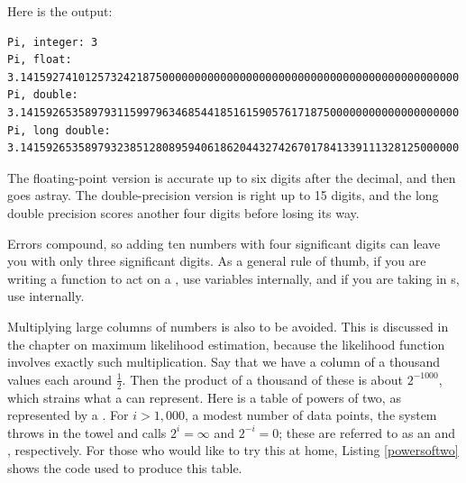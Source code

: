 Here is the output:
\begin{lstlisting}[language={}]
Pi, integer: 3
Pi, float:  3.14159274101257324218750000000000000000000000000000000000000000000000
Pi, double:      3.14159265358979311599796346854418516159057617187500000000000000000000
Pi, long double: 3.14159265358979323851280895940618620443274267017841339111328125000000
\end{lstlisting}
The floating-point version is accurate up to six digits after the
decimal, and then goes astray. The double-precision version is right up to 15
digits, and the long double precision scores another four digits before
losing its way.

Errors compound, so adding ten numbers
with four significant digits can leave you with only three significant
digits. As a general rule of thumb, if you are writing a
function to act on a , use  variables internally,
and if you are taking in s, use  internally.

\label{precisionproblem}
Multiplying large columns of numbers is also to be avoided. This is
discussed in the chapter on maximum likelihood estimation, because the
likelihood function involves exactly such multiplication. Say that we
have a column of a thousand values each around $\frac{1}{2}$. Then the
product of a thousand of these is about $2^{-1000}$, which strains what
a  can represent. Here is a table of powers of two, as
represented by a . For $i>1,000$, a
modest number of data points, the system throws in the towel and 
calls $2^i = \infty$ and $2^{-i} = 0$; these are referred to as
an  and , respectively. For those who would like
to try this at home, Listing \ref{powersoftwo} shows the code used to
produce this table.



